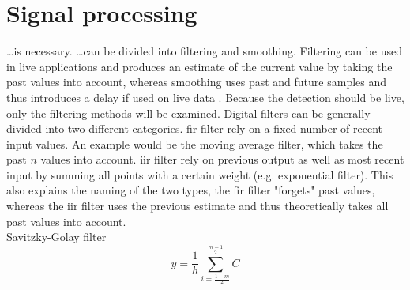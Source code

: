 \section{Signal processing}
\dots is necessary.
\dots can be divided into filtering and smoothing.
Filtering can be used in live applications and produces an estimate of the current value by taking the past values into account, whereas smoothing uses past and future samples and thus introduces a delay if used on live data .
Because the detection should be live, only the filtering methods will be examined.
Digital filters can be generally divided into two different categories.
\acrfull{fir} filter rely on a fixed number of recent input values. An example would be the moving average filter, which takes the past $n$ values into account.
\acrfull{iir} filter rely on previous output as well as most recent input by summing all points with a certain weight (e.g. exponential filter).
This also explains the naming of the two types, the \acrshort{fir} filter "forgets" past values, whereas the \acrshort{iir} filter uses the previous estimate and thus theoretically takes all past values into account.\\
Savitzky-Golay filter
\begin{equation}
	y = \frac{1}{h}\sum_{i =\frac{1 - m}{2}}^{\frac{m - 1}{2}}C
\end{equation}